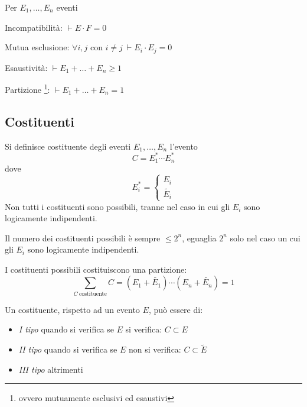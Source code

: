 \begin{definition}
  Per \( E_1, \ldots, E_n \) eventi

  Incompatibilità:
  \( \vdash E \cdot F = 0 \)

  Mutua esclusione:
  \( \forall i, j \text{ con } i \neq j ~ \vdash E_i \cdot E_j = 0 \)

  Esaustività:
  \( \vdash E_1 + \ldots + E_n \geq 1 \)

  Partizione
  \footnote{ovvero mutuamente esclusivi ed esaustivi}:
  \( \vdash E_1 + \ldots + E_n = 1 \)
\end{definition}

\subsection{Costituenti}
\begin{definition}[Costituente]
  Si definisce costituente degli eventi \( E_1, \ldots, E_n \) l'evento
  \[ C = E_1^* \cdots E_n^* \]
  dove
  \begin{equation*}
    E_i^* =
    \begin{cases}
      E_i \\
      \tilde{E_i}
    \end{cases}
  \end{equation*}
  Non tutti i costituenti sono possibili, tranne nel caso in cui gli $E_i$ sono logicamente indipendenti.
\end{definition}

Il numero dei costituenti possibili è sempre \( \leq 2^n \), eguaglia \( 2^n \) solo nel caso un cui gli $E_i$ sono logicamente indipendenti.

I costituenti possibili costituiscono una partizione:
\[ \sum_{C ~ \text{costituente}} C = (E_1 + \tilde{E_1}) \cdots (E_n + \tilde{E_n}) = 1\]

\begin{definition}
  Un costituente, rispetto ad un evento $E$, può essere di:
  \begin{itemize}
  \item \emph{I tipo} quando si verifica se $E$ si verifica: \( C \subset E \)
  \item \emph{II tipo} quando si verifica se $E$ non si verifica: \( C \subset \tilde{E} \)
  \item \emph{III tipo} altrimenti
  \end{itemize}
\end{definition}

